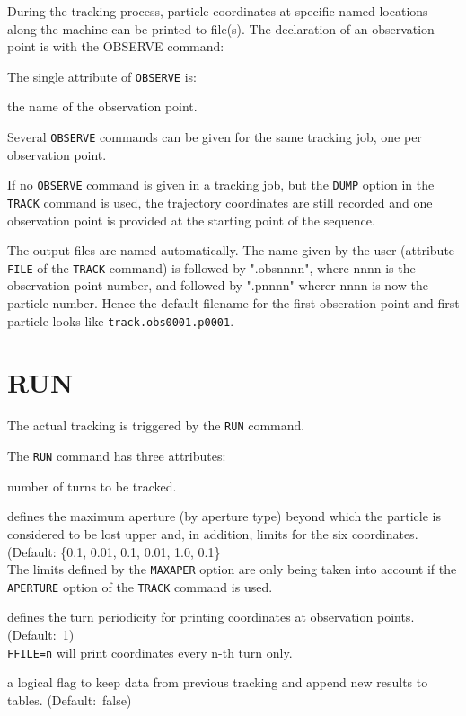 During the tracking process, particle coordinates at specific named
locations along the machine can be printed to file(s). The declaration of
an observation point is with the OBSERVE command: 


The single attribute of \texttt{OBSERVE} is:
\begin{madlist}
   the name of the observation point. 
\end{madlist}
  
Several \texttt{OBSERVE} commands can be given for the same tracking
job, one per observation point. 

If no \texttt{OBSERVE} command is given in a tracking job, but the
\texttt{DUMP} option in the \texttt{TRACK} command is used, the
trajectory coordinates are still recorded and one observation point is
provided at the starting point of the sequence. 
     
The output files are named automatically. The name given by
the user (attribute \texttt{FILE} of the \texttt{TRACK} command) is
followed by ".obsnnnn", where nnnn is the observation point number, and followed by 
".pnnnn"  wherer nnnn is now the particle number. Hence the default
filename for the first obseration point and first particle looks like
\texttt{track.obs0001.p0001}.


\section{RUN}
\label{sec:run}

The actual tracking is triggered by the \texttt{RUN} command.


The \texttt{RUN} command has three attributes:

\begin{madlist}
   number of turns to be tracked.

   defines the maximum aperture (by
  aperture type) beyond which the particle is considered
  to be lost upper and, in addition, limits for the six coordinates.\\
  (Default: \{0.1, 0.01, 0.1, 0.01, 1.0, 0.1\} \\
  The limits defined by the \texttt{MAXAPER} option are only being taken
  into account if the \texttt{APERTURE} option of the \texttt{TRACK}
  command is used. 

   defines the turn periodicity for printing coordinates at
   observation points. (Default:~1)\\

   \texttt{FFILE=n} will print coordinates every n-th turn only. 

    a logical flag to keep data from previous tracking and append new results to tables. (Default:~false)
\end{madlist}


